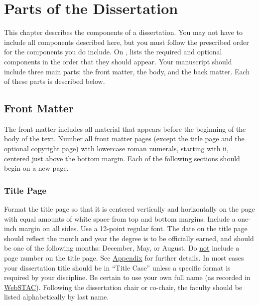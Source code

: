 \chapter{Parts of the Dissertation}
\label{chap:dissertation-parts}

This chapter describes the components of a dissertation.
You may not have to include all components described here, but you must follow the prescribed order for the components you do include.
On ,  lists the required and optional components in the order that they should appear.
Your manuscript should include three main parts: the front matter, the body, and the back matter.
Each of these parts is described below.

\section{Front Matter}

The front matter includes all material that appears before the beginning of the body of the text.
Number all front matter pages (except the title page and the optional copyright page) with lowercase roman numerals, starting with ii, centered just above the bottom margin.
Each of the following sections should begin on a new page.

\subsection{Title Page}

Format the title page so that it is centered vertically and horizontally on the page with equal amounts of white space from top and bottom margins.
Include a one-inch margin on all sides.
Use a 12-point regular font.
The date on the title page should reflect the month and year the degree is to be officially earned, and should be one of the following months: December, May, or August.
Do \underline{not} include a page number on the title page.
See \hyperref[app:degree-program]{Appendix} for further details.
In most cases your dissertation title should be in ``Title Case'' unless a specific format is required by your discipline.
Be certain to use your own full name (as recorded in \href{https://acadinfo.wustl.edu/}{WebSTAC}).
Following the dissertation chair or co-chair, the faculty should be listed alphabetically by last name.

